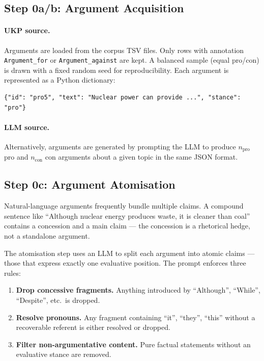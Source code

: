 \documentclass[runningheads]{llncs}
\begin{document}
\subsection{Step 0a/b: Argument Acquisition}

\paragraph{UKP source.} Arguments are loaded from the corpus TSV files.
Only rows with annotation \texttt{Argument\_for} or
\texttt{Argument\_against} are kept. A balanced sample (equal pro/con) is
drawn with a fixed random seed for reproducibility. Each argument is
represented as a Python dictionary:

\begin{lstlisting}[style=json]
{"id": "pro5", "text": "Nuclear power can provide ...", "stance": "pro"}
\end{lstlisting}

\paragraph{LLM source.} Alternatively, arguments are generated by prompting
the LLM to produce $n_{\text{pro}}$ pro and $n_{\text{con}}$ con arguments
about a given topic in the same JSON format.

\subsection{Step 0c: Argument Atomisation}

Natural-language arguments frequently bundle multiple claims. A compound
sentence like ``Although nuclear energy produces waste, it is cleaner than
coal'' contains a concession and a main claim — the concession is a
rhetorical hedge, not a standalone argument.

The atomisation step uses an LLM to split each argument into atomic
claims — those that express exactly one evaluative position. The prompt
enforces three rules:

\begin{enumerate}
  \item \textbf{Drop concessive fragments.} Anything introduced by
    ``Although'', ``While'', ``Despite'', etc.\ is dropped.
  \item \textbf{Resolve pronouns.} Any fragment containing ``it'',
    ``they'', ``this'' without a recoverable referent is either resolved
    or dropped.
  \item \textbf{Filter non-argumentative content.} Pure factual statements
    without an evaluative stance are removed.
\end{enumerate}
\end{document}
